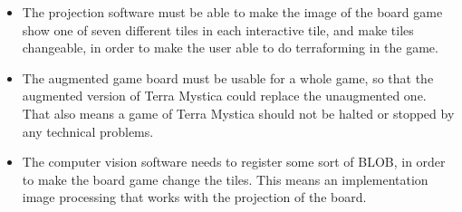 \begin{itemize}
	\item The projection software must be able to make the image of the board game show one of seven different tiles in each interactive tile, and make tiles changeable, in order to make the user able to do terraforming in the game.
	\item The augmented game board must be usable for a whole game, so that the augmented version of Terra Mystica could replace the unaugmented one. That also means a game of Terra Mystica should not be halted or stopped by any technical problems.
	\item The computer vision software needs to register some sort of BLOB, in order to make the board game change the tiles. This means an implementation image processing that works with the projection of the board.
\end{itemize} 